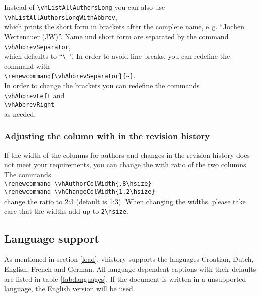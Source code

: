 Instead of \verb|\vhListAllAuthorsLong| you can also use\\
\mbox{}\hspace{2em}\verb|\vhListAllAuthorsLongWithAbbrev|,\\
which prints the short form in brackets after the complete name, e.\,g. ``Jochen Wertenauer (JW)''. Name und short form are separated by the command\\
\mbox{}\hspace{2em}\verb|\vhAbbrevSeparator|,\\
which defaults to ``\verb*|\ |''. In order to avoid line breaks, you can redefine the command with\\
\mbox{}\hspace{2em}\verb|\renewcommand{\vhAbbrevSeparator}{~}|.\\
In order to change the brackets you can redefine the commands\\
\mbox{}\hspace{2em}\verb|\vhAbbrevLeft| and\\
\mbox{}\hspace{2em}\verb|\vhAbbrevRight|\\
as needed.

\subsubsection{Adjusting the column with in the revision history}
If the width of the columns for authors and changes in the revision history does not meet your requirements, you can change the with ratio of the two columns. The commands\\
\mbox{}\hspace{2em}\verb|\renewcommand \vhAuthorColWidth{.8\hsize}|\\
\mbox{}\hspace{2em}\verb|\renewcommand \vhChangeColWidth{1.2\hsize}|\\
change the ratio to 2:3 (default is 1:3). When changing the widths, please take care that the widths add up to \verb|2\hsize|.

\subsection{Language support}\label{languages}
As mentioned in section \ref{load}, vhistory supports the languages Croatian, Dutch, English, French and German. All language dependent captions with their defaults are listed in table \ref{tab:languages}. If the document is written in a unsupported language, the English version will be used.

